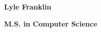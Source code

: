 \documentclass[11pt]{article}
\newcommand{\name}[1]{\noindent \textbf{#1}}
\newcommand{\program}[1]{\noindent \textbf{#1}}
\begin{document}
\name{Lyle Franklin}

\program{M.S. in Computer Science}








\end{document}
